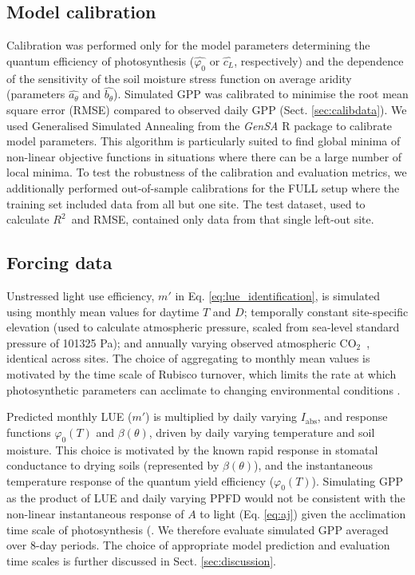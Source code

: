 \documentclass[gmd, manuscript]{copernicus}
\newcommand{\coo}{CO$_2$}
\newcommand{\rsq}{$R^2$}
\begin{document}
\subsection{Model calibration}
\label{sec:calib}
Calibration was performed only for the model parameters determining the quantum efficiency of photosynthesis ($\widehat{\varphi_0}$ or $\widehat{c_L}$, respectively) and the dependence of the sensitivity of the soil moisture stress function on average aridity (parameters $\widehat{a_{\theta}}$ and $\widehat{b_{\theta}}$). Simulated GPP was calibrated to minimise the root mean square error (RMSE) compared to observed daily GPP (Sect. \ref{sec:calibdata}). We used  Generalised Simulated Annealing from the \textit{GenSA} R package \citep{gensa} to calibrate model parameters. This algorithm is particularly suited to find global minima of non-linear objective functions in situations where there can be a large number of local minima. To test the robustness of the calibration and evaluation metrics, we additionally performed out-of-sample calibrations for the FULL setup where the training set included data from all but one site. The test dataset, used to calculate \rsq\ and RMSE, contained only data from that single left-out site.

\subsection{Forcing data}
\label{sec:forcingdata}

Unstressed light use efficiency, $m'$ in Eq. \ref{eq:lue_identification}, is simulated using monthly mean values for daytime $T$ and $D$; temporally constant site-specific elevation (used to calculate atmospheric pressure, scaled from sea-level standard pressure of 101325 Pa); and annually varying observed atmospheric \coo\ \citep{MacFarlingMeure2006}, identical across sites. The choice of aggregating to monthly mean values is motivated by the time scale of Rubisco turnover, which limits the rate at which photosynthetic parameters can acclimate to changing environmental conditions \citep{mcnevin06}.

Predicted monthly LUE ($m'$) is multiplied by daily varying $I_\text{abs}$, and response functions $\varphi_0(T)$ and $\beta(\theta)$, driven by daily varying temperature and soil moisture. This choice is motivated by the known rapid response in stomatal conductance to drying soils (represented by $\beta(\theta)$), and the instantaneous temperature response of the quantum yield efficiency ($\varphi_0(T)$). Simulating GPP as the product of LUE and daily varying PPFD would not be consistent with the non-linear instantaneous response of $A$ to light (Eq. \ref{eq:aj}) given the acclimation time scale of photosynthesis (\citep{suzuki01, maire12po}. We therefore evaluate simulated GPP averaged over 8-day periods. The choice of appropriate model prediction and evaluation time scales is further discussed in Sect. \ref{sec:discussion}.  
\end{document}

